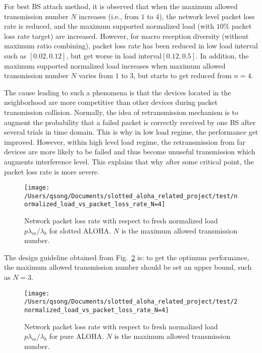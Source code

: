 For best BS attach method, it is observed that when the maximum allowed transmission number $N$ increases (i.e., from $1$ to $4$), the network level packet loss rate is reduced, and the maximum supported normalized load (with $10\%$ packet loss rate target) are increased. 
However, for macro reception diversity (without maximum ratio combining), packet loss rate has been reduced in low load interval such as $[0.02, 0.12]$, but get worse in load interval$[0.12, 0.5]$. In addition, the maximum supported normalized load increases when maximum allowed transmission number $N$ varies from $1$ to $3$, but starts to get reduced from $n=4$.

The cause leading to such a phenomena is that the devices located in the neighborhood are more competitive than other devices during packet transmission collision. Normally, the idea of retransmission mechanism is to augment the probability that a failed packet is correctly received by one BS after several trials in time domain. This is why in low load regime, the performance get improved. However, within high level load regime, the retransmission from far devices are more likely to be failed and thus become unuseful transmission which augments interference level. This explains that why after some critical point, the packet loss rate is more severe.
\begin{figure}[!th]
	\centering
	\texttt{[image: /Users/qsong/Documents/slotted\_aloha\_related\_project/test/normalized\_load\_vs\_packet\_loss\_rate\_N=4]}
	\caption{Network packet loss rate with respect to fresh normalized load $p\lambda_{m}/\lambda_{b}$ for slotted ALOHA. $N$ is the maximum allowed transmission number.}
	\label{fig:load_vs_packet_loss_rate_slotted}
\end{figure}

The design guideline obtained from Fig.~\ref{fig:load_vs_packet_loss_rate_diversity} is: to get the optimum performance, the maximum allowed transmission number should be set an upper bound, such as $N = 3$.

\begin{figure}[!th]
	\centering
	\texttt{[image: /Users/qsong/Documents/slotted\_aloha\_related\_project/test/2normalized\_load\_vs\_packet\_loss\_rate\_N=4]}
	\caption{Network packet loss rate with respect to fresh normalized load $p\lambda_{m}/\lambda_{b}$ for pure ALOHA. $N$ is the maximum allowed transmission number.}
	\label{fig:load_vs_packet_loss_rate_diversity}
\end{figure}

